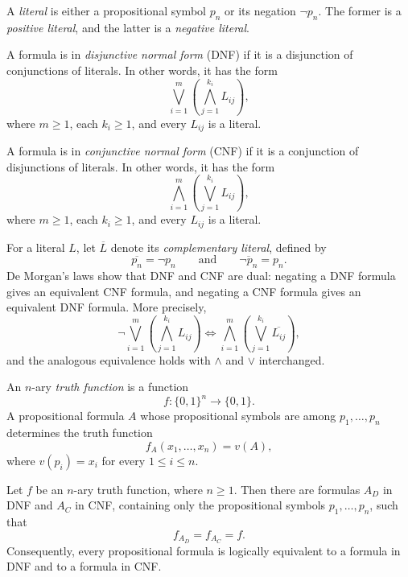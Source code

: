 \documentclass[11pt,a4paper]{amsart}
\begin{document}
\begin{definition}[Literal]
  A \emph{literal} is either a propositional symbol \(p_n\) or its negation
  \(\neg p_n\). The former is a \emph{positive literal}, and the latter is a
  \emph{negative literal}.
\end{definition}

\begin{definition}
  A formula is in \emph{disjunctive normal form} (DNF) if it is a disjunction
  of conjunctions of literals. In other words, it has the form
  \[
    \bigvee_{i=1}^m\left(\bigwedge_{j=1}^{k_i}L_{ij}\right),
  \]
  where \(m\geq 1\), each \(k_i\geq 1\), and every \(L_{ij}\) is a literal.
\end{definition}

\begin{definition}
  A formula is in \emph{conjunctive normal form} (CNF) if it is a conjunction
  of disjunctions of literals. In other words, it has the form
  \[
    \bigwedge_{i=1}^m\left(\bigvee_{j=1}^{k_i}L_{ij}\right),
  \]
  where \(m\geq 1\), each \(k_i\geq 1\), and every \(L_{ij}\) is a literal.
\end{definition}

For a literal \(L\), let \(\overline L\) denote its \emph{complementary
literal}, defined by
\[
  \overline{p_n}=\neg p_n
  \qquad\text{and}\qquad
  \overline{\neg p_n}=p_n.
\]
De Morgan's laws show that DNF and CNF are dual: negating a DNF formula gives
an equivalent CNF formula, and negating a CNF formula gives an equivalent DNF
formula. More precisely,
\[
  \neg\bigvee_{i=1}^m\left(\bigwedge_{j=1}^{k_i}L_{ij}\right)
  \Leftrightarrow
  \bigwedge_{i=1}^m\left(\bigvee_{j=1}^{k_i}\overline{L_{ij}}\right),
\]
and the analogous equivalence holds with \(\land\) and \(\lor\) interchanged.

\begin{definition}
  An \(n\)-ary \emph{truth function} is a
  function
  \[
    f\colon\{0,1\}^n\longrightarrow\{0,1\}.
  \]
  A propositional formula \(A\) whose propositional symbols are among
  \(p_1,\ldots,p_n\) determines the truth function
  \[
    f_A(x_1,\ldots,x_n)=v(A),
  \]
  where \(v(p_i)=x_i\) for every \(1\leq i\leq n\).
\end{definition}

\begin{theorem}
  Let \(f\) be an \(n\)-ary truth function, where \(n\geq 1\). Then there are
  formulas \(A_D\) in DNF and \(A_C\) in CNF, containing only the
  propositional symbols \(p_1,\ldots,p_n\), such that
  \[
    f_{A_D}=f_{A_C}=f.
  \]
  Consequently, every propositional formula is logically equivalent to a
  formula in DNF and to a formula in CNF.
\end{theorem}
\end{document}
